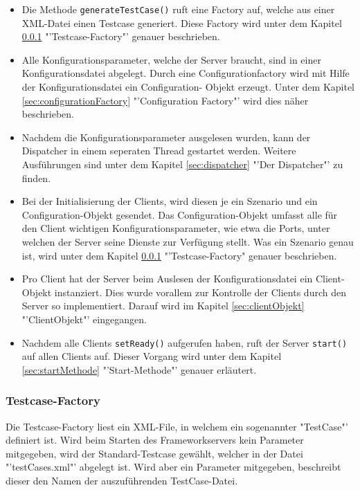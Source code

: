 \begin{itemize}
\item Die Methode \texttt{generateTestCase()} ruft eine Factory auf, welche aus einer XML-Datei einen Testcase generiert. Diese Factory wird unter dem Ka\-pi\-tel \ref{sec:testCaseFactory} "'Testcase-Factory"' genauer be\-schrie\-ben.
\item Alle Konfigurationsparameter, welche der Server braucht, sind in einer Konfigurations\-datei ab\-ge\-legt. Durch eine Configurationfactory wird mit Hilfe der Konfig\-urationsdatei ein Configuration- Objekt er\-zeugt. Unter dem Kapi\-tel \ref{sec:configurationFactory} "'Configuration Factory"' wird dies näher beschrieben.
\item Nachdem die Konfigurationsparameter ausgelesen wurden, kann der Dis\-patcher in einem seper\-aten Thread ge\-startet werden. Weitere Aus\-füh\-run\-gen sind unter dem Kapitel \ref{sec:dispatcher} "'Der Dispatcher"' zu finden.
\item Bei der Initialisierung der Clients, wird diesen je ein Szenario und ein Configuration-Objekt gesendet. Das Configuration-Objekt umfasst alle für den Client wichtigen Konfigurationsparameter, wie etwa die Ports, unter welchen der Server seine Dienste zur Verfügung stellt. Was ein Szenario genau ist, wird unter dem Kapitel \ref{sec:testCaseFactory} "'Testcase-Factory" genauer beschrieben.
\item Pro Client hat der Server beim Auslesen der Konfigurationsdatei ein Client-Objekt instanziert. Dies wurde voral\-lem zur Kon\-trol\-le der Cli\-ents durch den Server so implementiert. Darauf wird im Kapitel \ref{sec:clientObjekt} "'ClientObjekt"' eingegangen.
\item Nachdem alle Clients \texttt{setReady()} aufgerufen haben, ruft der Server \texttt{start()} auf allen Clients auf. Dieser Vorgang wird unter dem Kapitel \ref{sec:startMethode} "'Start-Methode"' genauer erläutert.
\end{itemize}

\subsubsection{Testcase-Factory}
\label{sec:testCaseFactory}
Die Testcase-Factory liest ein XML-File, in welchem ein sogenannter "TestCase"' definiert ist. Wird beim Starten des Frameworkservers kein Parameter mitgegeben, wird der Standard-Testcase gewählt, welcher in der Datei "'test\-Cases\-.xml"' abgelegt ist. Wird aber ein Parameter mitgegeben, beschreibt dieser den Namen der auszuführenden TestCase-Datei.

